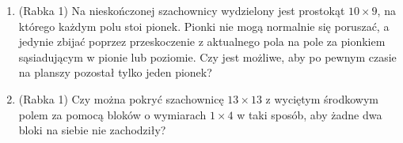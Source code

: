 \documentclass{article}
\begin{document}
\begin{enumerate}
\begin{enumerate}[\roman*.]
\begin{enumerate}[1.]
				\item (Rabka 1) Na nieskończonej szachownicy wydzielony jest prostokąt $10 \times 9$, na którego każdym polu stoi pionek. Pionki nie mogą normalnie się poruszać, a jedynie zbijać poprzez przeskoczenie z aktualnego pola na pole za pionkiem sąsiadującym w pionie lub poziomie. Czy jest możliwe, aby po pewnym czasie na planszy pozostał tylko jeden pionek?
				
				\item (Rabka 1) Czy można pokryć szachownicę $13 \times 13$ z wyciętym środkowym polem za pomocą bloków o wymiarach $1 \times 4$ w taki sposób, aby żadne dwa bloki na siebie nie zachodziły?
			\end{enumerate}
		\end{enumerate}
	\end{enumerate}
\end{document}
